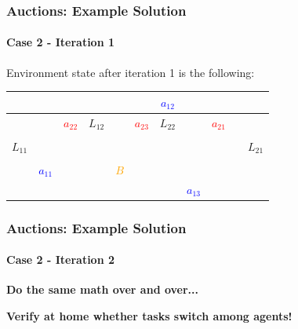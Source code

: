 \begin{frame}
	\frametitle{Auctions: Example Solution}
	\framesubtitle{Case 2 - Iteration 1}
	
	\large
	
	\vspace{0.5cm}
	
	Environment state after iteration 1 is the following:
	
	\begin{table}[!h]
		\centering
		\setlength\tabcolsep{7pt}
		\def\arraystretch{1.3}
		\begin{tabular}{|c|c|c|c|c|c|c|c|c|c|c|}
			\hline
			&  & & & & & \textcolor{blue}{$ a_{12} $} & &  &  &  \\ \hline
			
			&  & \textcolor{red}{$ a_{22} $} & $ L_{12} $ &  & \textcolor{red}{$ a_{23} $} & $ L_{22} $ &  & \textcolor{red}{$ a_{21} $} & & \\ \hline
			
			&  &  &  &  &  &  &  &  &  & \\ \hline
			
			$ L_{11} $ &  &  &  &  &  &  &  &  &  & $ L_{21} $ \\ \hline
			
			&  &  &  &  &  &  &  &  &  & \\ \hline
			
			& \textcolor{blue}{$ a_{11} $} &  &  & \textcolor{orange}{$ B $} &  &  &  &  & &  \\ \hline
			
			& &  &  &  &  &  & \textcolor{blue}{$ a_{13} $} & &  & \\ \hline
		\end{tabular}
	\end{table}
\end{frame}

\begin{frame}
	\frametitle{Auctions: Example Solution}
	\framesubtitle{Case 2 - Iteration 2}
	
	\Large
	
	\begin{center}
		\textbf{Do the same math over and over...} \\
		
		\vspace{0.5cm}
		
		\textbf{Verify at home whether tasks switch among agents!}
	\end{center}
\end{frame}

